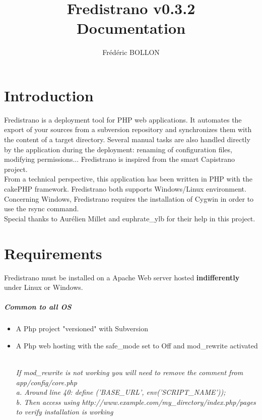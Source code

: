 \documentclass[12pt,a4paper]{report}
\author{Frédéric BOLLON}
\title{Fredistrano v0.3.2\\Documentation\\}
\begin{document}
\maketitle
\tableofcontents

\chapter{Introduction}
Fredistrano is a deployment tool for PHP web applications. It automates the export of your sources from a subversion repository and synchronizes them with the content of a target directory. Several manual tasks are also handled directly by the application during the deployment: renaming of configuration files, modifying permissions... Fredistrano is inspired from the smart Capistrano project.\\

From a technical perspective, this application has been written in PHP with the cakePHP framework. Fredistrano both supports Windows/Linux environment. Concerning Windows, Fredistrano requires the installation of Cygwin in order to use the rsync command.\\

Special thanks to Aurélien Millet and euphrate\_ylb for their help in this project.

\chapter{Requirements}
Fredistrano must be installed on a Apache Web server hosted \textbf{indifferently} under Linux or Windows.
\paragraph*{Common to all OS}
\begin{itemize}
\item 
A Php project "versioned" with Subversion
\item 
A Php web hosting with the safe\_mode set to Off and mod\_rewrite activated\\\\
\begin{small}\textit{If mod\_rewrite is not working you will need to remove the comment from app/config/core.php\\
      a. Around line 40: define ('BASE\_URL', env('SCRIPT\_NAME'));\\
      b. Then access using http://www.example.com/my\_directory/index.php/pages to verify installation is working}\end{small}
\end{itemize}
\end{document}
